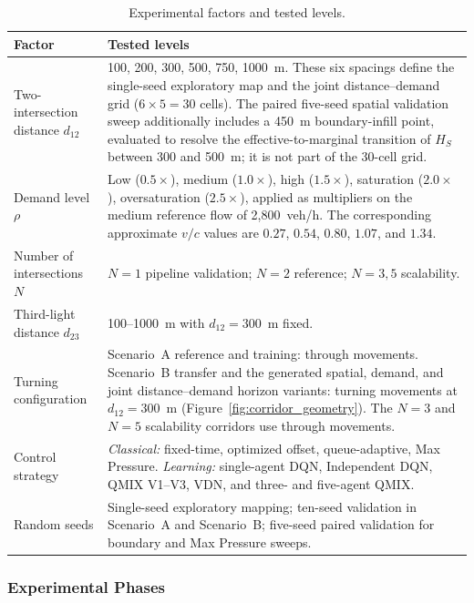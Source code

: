 \documentclass[review,12pt]{elsarticle}
\begin{document}
\begin{table}[!htbp]
\centering
\caption{Experimental factors and tested levels.}
\label{tab:experimental_factors}
\small
\setlength{\tabcolsep}{5pt}
\begin{tabularx}{\textwidth}{p{3.4cm}Y}
\toprule
\textbf{Factor} & \textbf{Tested levels} \\
\midrule
Two-intersection distance $d_{12}$ &
100, 200, 300, 500, 750, 1000~m. These six spacings define the single-seed
exploratory map and the joint distance--demand grid ($6\times5=30$ cells).
The paired five-seed spatial validation sweep additionally includes a
450~m boundary-infill point, evaluated to resolve the effective-to-marginal
transition of $H_S$ between 300 and 500~m; it is not part of the 30-cell grid. \\
Demand level $\rho$ &
Low ($0.5\times$), medium ($1.0\times$), high ($1.5\times$),
saturation ($2.0\times$), oversaturation ($2.5\times$), applied as multipliers
on the medium reference flow of 2{,}800~veh/h. The corresponding approximate
$v/c$ values are $0.27$, $0.54$, $0.80$, $1.07$, and $1.34$. \\
Number of intersections $N$ &
$N=1$ pipeline validation; $N=2$ reference; $N=3,5$ scalability. \\
Third-light distance $d_{23}$ &
100--1000~m with $d_{12}=300$~m fixed. \\
Turning configuration &
Scenario~A reference and training: through movements. Scenario~B transfer and
the generated spatial, demand, and joint distance--demand horizon variants:
turning movements at $d_{12}=300$~m (Figure~\ref{fig:corridor_geometry}).
The $N=3$ and $N=5$ scalability corridors use through movements. \\
Control strategy &
\textit{Classical:} fixed-time, optimized offset, queue-adaptive, Max Pressure.
\textit{Learning:} single-agent DQN, Independent DQN, QMIX V1--V3, VDN, and
three- and five-agent QMIX. \\
Random seeds &
Single-seed exploratory mapping; ten-seed validation in Scenario~A and Scenario~B;
five-seed paired validation for boundary and Max Pressure sweeps. \\
\bottomrule
\end{tabularx}
\end{table}

\subsubsection{Experimental Phases}
\end{document}
